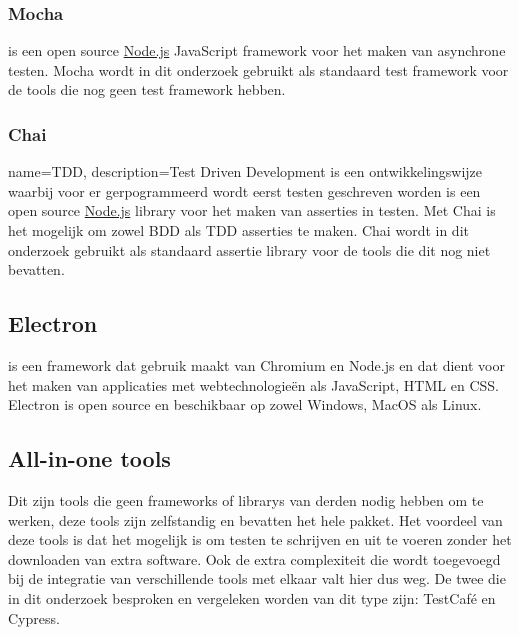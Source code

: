 \subsubsection{Mocha}
\label{mocha}
\textcite{Mocha} is een open source \hyperref[nodejs]{Node.js} JavaScript \gls{framework} voor het maken van asynchrone testen. Mocha wordt in dit onderzoek gebruikt als standaard test \gls{framework} voor de \glspl{tool} die nog geen test \gls{framework} hebben.

\subsubsection{Chai}
\label{chai}
{
    name={TDD},
    description={Test Driven Development is een ontwikkelingswijze waarbij voor er gerpogrammeerd wordt eerst testen geschreven worden}
}
\textcite{Chai} is een open source \hyperref[nodejs]{Node.js} \gls{library} voor het maken van \glspl{assertie} in testen. Met Chai is het mogelijk om zowel \gls{BDD} als \gls{TDD} \glspl{assertie} te maken. Chai wordt in dit onderzoek gebruikt als standaard \gls{assertie} \gls{library} voor de \glspl{tool} die dit nog niet bevatten.

\subsection{Electron}
\label{electron}
\textcite{Electron} is een \gls{framework} dat gebruik maakt van Chromium en Node.js en dat dient voor het maken van applicaties met webtechnologieën als JavaScript, \gls{HTML} en \gls{CSS}. Electron is open source en beschikbaar op zowel Windows, MacOS als Linux.

\clearpage
\subsection{All-in-one tools}

Dit zijn \glspl{tool} die geen \glspl{framework} of \glspl{library} van derden nodig hebben om te werken, deze \glspl{tool} zijn zelfstandig en bevatten het hele pakket. Het voordeel van deze \glspl{tool} is dat het mogelijk is om testen te schrijven en uit te voeren zonder het downloaden van extra software. Ook de extra complexiteit die wordt toegevoegd bij de integratie van verschillende \glspl{tool} met elkaar valt hier dus weg. De twee die in dit onderzoek besproken en vergeleken worden van dit type zijn: TestCafé en Cypress.


